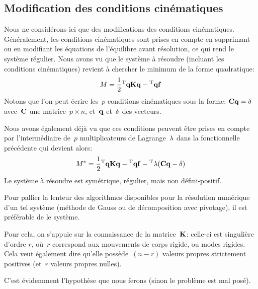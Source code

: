 \subsection{Modification des conditions cinématiques}
Nous ne considérons ici que des modifications des conditions cinématiques.
Généralement, les conditions cinématiques sont prises en compte en supprimant ou en
modifiant les équations de l'équilibre avant résolution, ce qui rend le système régulier.
Nous avons vu que le système à résoudre (incluant les conditions cinématiques) revient
à chercher le minimum de la forme quadratique:
\begin{equation}M=\frac12 \LL{q}\MM{K}\VV{q} -\LL{q}\VV{f}\end{equation}
Notons que l'on peut écrire les~$p$ conditions cinématiques sous la forme:
$\MM{C}\VV{q} = \VV{\delta}$
avec~$\MM{C}$ une matrice~$p\times n$, et~$\VV{q}$ et~$\VV{\delta}$ des vecteurs.

Nous avons également déjà vu que ces conditions peuvent être prises en compte
par l'intermédiaire de~$p$ multiplicateurs de Lagrange~$\VV{\lambda}$ dans la fonctionnelle précédente
qui devient alors:
\begin{equation}
M^*=\frac12 \LL{q}\MM{K}\VV{q} -\LL{q}\VV{f} - \LL{\lambda}(\MM{C}\VV{q} - \VV{\delta})
\end{equation}
Le système à résoudre est symétrique, régulier, mais non défini-positif.

\medskip
Pour pallier la lenteur des algorithmes disponibles pour la résolution numérique d'un tel
système (méthode de Gauss ou de décomposition avec pivotage), il est préférable
de  le système.

Pour cela, on s'appuie sur la connaissance de la matrice~$\MM{K}$: celle-ci est singulière d'ordre
$r$, où~$r$ correspond aux mouvements de corps rigide, ou modes rigides. Cela veut
également dire qu'elle possède~$(n-r)$ valeurs propres strictement positives (et~$r$ valeurs
propres nulles).

 C'est évidemment l'hypothèse que
nous ferons (sinon le problème est mal posé).

